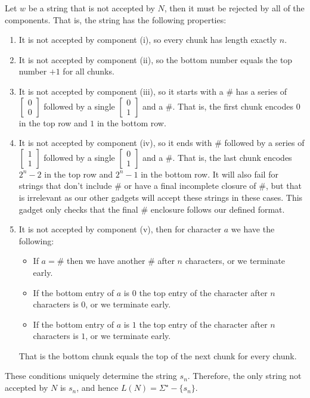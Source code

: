 \documentclass[12pt]{article}
\begin{document}
\begin{solution}
\begin{enumerate}
        Let $w$ be a string that is not accepted by $N$, then it must be rejected by all of the components. That is, the string has the following properties: 
        \begin{enumerate}
            \item It is not accepted by component (i), so every chunk has length exactly $n$. 
            \item It is not accepted by component (ii), so the bottom number equals the top number $+1$ for all chunks.
            \item It is not accepted by component (iii), so it starts with a $\#$ has a series of $\begin{bmatrix}
                0\\0
            \end{bmatrix}$ followed by a single $\begin{bmatrix}
                0\\1
            \end{bmatrix}$ and a $\#$. That is, the first chunk encodes $0$ in the top row and $1$ in the bottom row.
            \item It is not accepted by component (iv), so it ends with $\#$ followed by a series of $\begin{bmatrix}
                1\\1
            \end{bmatrix}$ followed by a single $\begin{bmatrix}
                0\\1
            \end{bmatrix}$ and a $\#$. That is, the last chunk encodes $2^n - 2$ in the top row and $2^n-1$ in the bottom row. It will also fail for strings that don't include $\#$ or have a final incomplete closure of $\#$, but that is irrelevant as our other gadgets will accept these strings in these cases. This gadget only checks that the final $\#$ enclosure follows our defined format.
            \item It is not accepted by component (v), then for character $a$ we have the following: 
            \begin{itemize}
                \item If $a = \#$ then we have another $\#$ after $n$ characters, or we terminate early.
                \item If the bottom entry of $a$ is $0$ the top entry of the character after $n$ characters is $0$, or we terminate early. 
                \item If the bottom entry of $a$ is $1$ the top entry of the character after $n$ characters is $1$, or we terminate early. 
            \end{itemize}
            That is the bottom chunk equals the top of the next chunk for every chunk. 
        \end{enumerate}
        These conditions uniquely determine the string $s_n$. Therefore, the only string not accepted by $N$ is $s_n$, and hence $L(N) = \Sigma ^\star - \{s_n\}.$
    \end{enumerate}
\end{solution}
\end{document}
